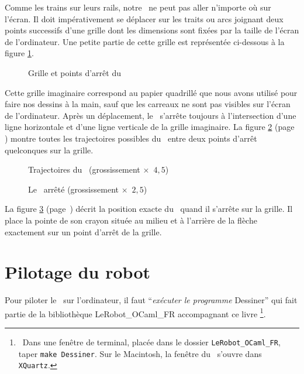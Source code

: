 \smallskip

Comme les trains sur leurs rails, notre \robot\ ne peut pas aller 
n'importe où sur l'écran. Il doit impérativement se déplacer sur 
les traits ou arcs joignant deux points successifs d'une grille dont les dimensions sont 
fixées par la taille de l'écran de l'ordinateur. Une petite partie de cette grille
est  représentée \hbox{ci-dessous} à la figure \ref{fig:grille}.
%
\begin{figure}[htbp]
 \caption{Grille et points d'arrêt du \protect\robot}
 \label{fig:grille}
\end{figure}

\noindent Cette grille imaginaire correspond au papier quadrillé que nous avons utilisé pour
faire nos dessins à la main, sauf que les carreaux ne sont pas visibles sur 
l'écran de l'ordinateur. 
Après un déplacement, le \robot\ s'arrête toujours à l'intersection
d'une ligne horizontale et d'une ligne verticale de la grille imaginaire. La figure
 \ref{fig:traject} (page \pageref{fig:traject}) montre toutes les trajectoires possibles
du \robot\ entre deux points d'arrêt quelconques sur la grille.
\begin{figure}[htbp]
 \caption{Trajectoires du \protect\robot\ (grossissement $\times$\ $4,5$)}
 \label{fig:traject}
\end{figure}
\begin{figure}[htbp]
 \caption{Le \protect\robot\ arrêté (grossissement $\times$\ $2,5$)}
 \label{fig:robot-arrete}
\end{figure}
La figure \ref{fig:robot-arrete} \hbox{(page \pageref{fig:robot-arrete})} 
décrit la position
exacte du \robot\ quand il s'arrête sur la grille. Il place la pointe de
son crayon située au milieu et à l'arrière de la flèche exactement sur
un point d'arrêt de la grille.


\section{Pilotage du robot} 

Pour piloter le \robot\ sur l'ordinateur, il faut ``{\em exécuter le programme}
{\idt Des\-si\-ner}'' qui fait partie de la bibliothèque {\idt LeRobot\_OCaml\_FR}
accompagnant ce livre%
\footnote{\ Dans une fenêtre de terminal, placée dans le dossier {\tt LeRobot\_OCaml\_FR}, 
taper {\tt make Des\-si\-ner}. Sur le Macintosh, la fenêtre du \robot\ s'ouvre 
dans {\tt XQuartz}.}. 

